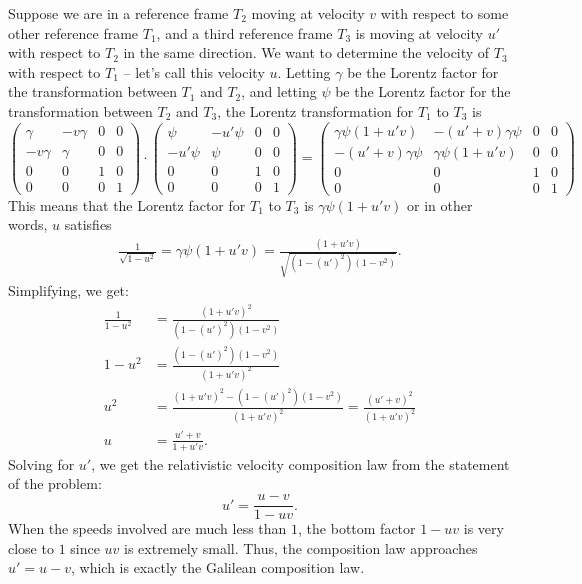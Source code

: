 \documentclass{../../templates/lkx_pset}
\begin{document}
\begin{solution}
	Suppose we are in a reference frame $T_2$ moving at velocity $v$ with respect to some other reference frame $T_1$, and a third reference frame $T_3$ is moving at velocity $u'$ with respect to $T_2$ in the same direction. We want to determine the velocity of $T_3$ with respect to $T_1$ -- let's call this velocity $u$. Letting $\gamma$ be the Lorentz factor for the transformation between $T_1$ and $T_2$, and letting $\psi$ be the Lorentz factor for the transformation between $T_2$ and $T_3$, the Lorentz transformation for $T_1$ to $T_3$ is
	\[
		\begin{pmatrix}
			\gamma   & -v\gamma & 0 & 0 \\
			-v\gamma & \gamma   & 0 & 0 \\
			0        & 0        & 1 & 0 \\
			0        & 0        & 0 & 1
		\end{pmatrix}\cdot
		\begin{pmatrix}
			\psi    & -u'\psi & 0 & 0 \\
			-u'\psi & \psi    & 0 & 0 \\
			0       & 0       & 1 & 0 \\
			0       & 0       & 0 & 1
		\end{pmatrix} =
		\begin{pmatrix}
			\gamma\psi(1+u'v) & -(u'+v)\gamma\psi & 0 & 0 \\
			-(u'+v)\gamma\psi & \gamma\psi(1+u'v) & 0 & 0 \\
			0                 & 0                 & 1 & 0 \\
			0                 & 0                 & 0 & 1
		\end{pmatrix}
	\]
	This means that the Lorentz factor for $T_1$ to $T_3$ is $\gamma\psi (1+u'v)$ or in other words, $u$ satisfies
	\[
		\begin{aligned}
			\frac{1}{\sqrt{1-u^2}} = \gamma\psi(1+u'v) = \frac{(1+u'v)}{\sqrt{(1-(u')^2)(1-v^2)}}.
		\end{aligned}
	\]
	Simplifying, we get:
	\[
		\begin{aligned}
			\frac{1}{1-u^2} & = \frac{(1+u'v)^2}{(1-(u')^2)(1-v^2)}                                          \\
			1-u^2           & = \frac{(1-(u')^2)(1-v^2)}{(1+u'v)^2}                                          \\
			u^2             & = \frac{(1+u'v)^2 - (1-(u')^2)(1-v^2)}{(1+u'v)^2} = \frac{(u'+v)^2}{(1+u'v)^2} \\
			u               & = \frac{u'+v}{1+u'v}.
		\end{aligned}
	\]
	Solving for $u'$, we get the relativistic velocity composition law from the statement of the problem:
	\[
		u' = \frac{u-v}{1-uv}.
	\]
	When the speeds involved are much less than $1$, the bottom factor $1-uv$ is very close to $1$ since $uv$ is extremely small. Thus, the composition law approaches $u' = u-v$, which is exactly the Galilean composition law.
\end{solution}
\end{document}
